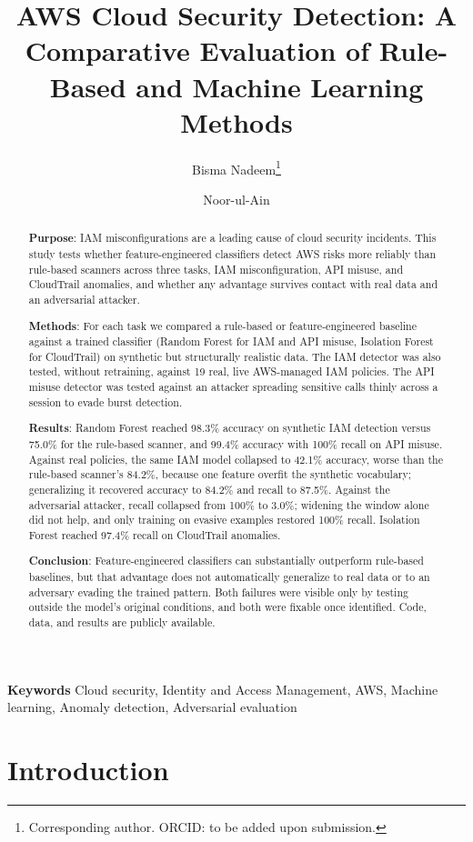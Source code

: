 \documentclass[11pt,a4paper]{article}
\title{AWS Cloud Security Detection: A Comparative Evaluation of Rule-Based and Machine Learning Methods}
\author[1]{Bisma Nadeem\thanks{Corresponding author. ORCID: to be added upon submission.}}
\author[1]{Noor-ul-Ain}
\affil[1]{Independent Researcher, Lahore, Pakistan (B.S. Computer Science, PUCIT, University of the Punjab, 2024). Email: bismanadeempucit@gmail.com, noorulain.pucit@gmail.com}
\date{}
\begin{document}
\maketitle

\begin{abstract}
\textbf{Purpose}: IAM misconfigurations are a leading cause of cloud security incidents. This study tests whether feature-engineered classifiers detect AWS risks more reliably than rule-based scanners across three tasks, IAM misconfiguration, API misuse, and CloudTrail anomalies, and whether any advantage survives contact with real data and an adversarial attacker.

\textbf{Methods}: For each task we compared a rule-based or feature-engineered baseline against a trained classifier (Random Forest for IAM and API misuse, Isolation Forest for CloudTrail) on synthetic but structurally realistic data. The IAM detector was also tested, without retraining, against 19 real, live AWS-managed IAM policies. The API misuse detector was tested against an attacker spreading sensitive calls thinly across a session to evade burst detection.

\textbf{Results}: Random Forest reached 98.3\% accuracy on synthetic IAM detection versus 75.0\% for the rule-based scanner, and 99.4\% accuracy with 100\% recall on API misuse. Against real policies, the same IAM model collapsed to 42.1\% accuracy, worse than the rule-based scanner's 84.2\%, because one feature overfit the synthetic vocabulary; generalizing it recovered accuracy to 84.2\% and recall to 87.5\%. Against the adversarial attacker, recall collapsed from 100\% to 3.0\%; widening the window alone did not help, and only training on evasive examples restored 100\% recall. Isolation Forest reached 97.4\% recall on CloudTrail anomalies.

\textbf{Conclusion}: Feature-engineered classifiers can substantially outperform rule-based baselines, but that advantage does not automatically generalize to real data or to an adversary evading the trained pattern. Both failures were visible only by testing outside the model's original conditions, and both were fixable once identified. Code, data, and results are publicly available.
\end{abstract}

\noindent\textbf{Keywords} Cloud security, Identity and Access Management, AWS, Machine learning, Anomaly detection, Adversarial evaluation

\section{Introduction}
\end{document}
